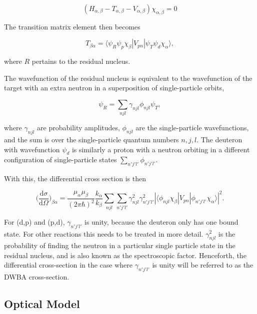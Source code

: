 \begin{equation}
(H_{\alpha,\beta}-T_{\alpha,\beta}-V_{\alpha,\beta})\chi_{\alpha,\beta} = 0
\end{equation} 

The transition matrix element then becomes

\begin{equation}
\mathit{T}_{\beta\alpha} =  \langle \psi_R \psi_p \chi_\beta | V_{pn} | \psi_T \psi_d \chi_\alpha   \rangle\mathrm{,}
\end{equation}

where $R$ pertains to the residual nucleus.

The wavefunction of the residual nucleus is equivalent to the wavefunction of the target with an extra neutron in a superposition of single-particle orbits,

\begin{equation}
\psi_R = \sum_{njl} \gamma_{njl} \phi_{njl} \psi_T \mathrm{,}
\end{equation}

where $\gamma_{njl}$ are probability amplitudes, $\phi_{njl}$ are the single-particle wavefunctions, and the sum is over the single-particle quantum numbers $n,j,l$. The deuteron with wavefunction $\psi_d$ is similarly a proton with a neutron orbiting in a different configuration of single-particle states $\sum_{n'j'l'}\phi_{n'j'l'}$.

With this, the differential cross section is then

\begin{equation}
\bigg ( \frac{\mathrm{d} \sigma}{\mathrm{d} \Omega} \bigg )_{\beta \alpha} =\frac{\mu_\alpha \mu_\beta}{(2 \pi \hbar)^2}  \frac{k_\alpha}{k_\beta}  \sum_{njl} \sum_{n'j'l'} \gamma_{njl}^2\gamma_{n'j'l'}^2 |\langle  \phi_{njl} \chi_\beta | V_{pn} | \phi_{n'j'l'} \chi_\alpha  \rangle |^2\mathrm{.}
\end{equation}

For (d,p) and (p,d), $\gamma_{n'j'l'}$ is unity, because the deuteron only has one bound state. For other reactions this needs to be treated in more detail.  $\gamma_{njl}^2$ is the probability of finding the neutron in a particular single particle state in the residual nucleus, and is also known as the spectroscopic factor. Henceforth, the differential cross-section in the case where $\gamma_{n'j'l'}$ is unity will be referred to as the DWBA cross-section.

\subsection{Optical Model} \label{ssec:opticalModel}


